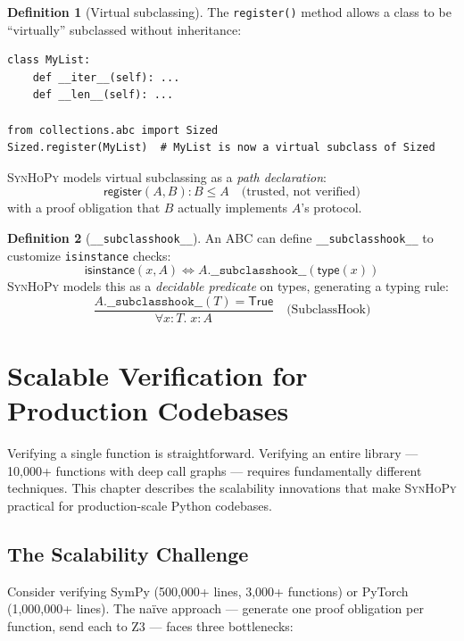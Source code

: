 \documentclass[11pt,a4paper]{report}
\theoremstyle{definition}
\newtheorem{definition}{Definition}[chapter]
\theoremstyle{plain}
\newcommand{\synhopy}{\textsc{SynHoPy}}
\begin{document}
\begin{definition}[Virtual subclassing]
The \lstinline[style=python]{register()} method allows a class to be
``virtually'' subclassed without inheritance:
\begin{lstlisting}[style=python]
class MyList:
    def __iter__(self): ...
    def __len__(self): ...

from collections.abc import Sized
Sized.register(MyList)  # MyList is now a virtual subclass of Sized
\end{lstlisting}

\synhopy{} models virtual subclassing as a \emph{path declaration}:
\[
  \mathsf{register}(A, B) : B \leq A \quad\text{(trusted, not verified)}
\]
with a proof obligation that $B$ actually implements $A$'s protocol.
\end{definition}

\begin{definition}[\texttt{\_\_subclasshook\_\_}]
An ABC can define \lstinline[style=python]{__subclasshook__} to customize
\lstinline[style=python]{isinstance} checks:
\[
  \mathsf{isinstance}(x, A) \iff A.\mathtt{\_\_subclasshook\_\_}(\mathsf{type}(x))
\]
\synhopy{} models this as a \emph{decidable predicate} on types, generating
a typing rule:
\[
  \frac{
    A.\mathtt{\_\_subclasshook\_\_}(T) = \mathsf{True}
  }{
    \forall x : T.\; x : A
  } \quad \text{(SubclassHook)}
\]
\end{definition}



\chapter{Scalable Verification for Production Codebases}
\label{ch:scalable}

Verifying a single function is straightforward. Verifying an entire library
--- 10,000+ functions with deep call graphs --- requires fundamentally different
techniques. This chapter describes the scalability innovations that make \synhopy{}
practical for production-scale Python codebases.

\section{The Scalability Challenge}

Consider verifying SymPy (500,000+ lines, 3,000+ functions) or PyTorch
(1,000,000+ lines). The na\"ive approach --- generate one proof obligation per
function, send each to Z3 --- faces three bottlenecks:
\end{document}

